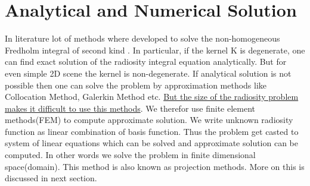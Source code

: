 \section{Analytical and Numerical Solution}
In literature lot of methods where developed to solve the non-homogeneous Fredholm integral of second kind \cite{iesurvey}\cite{ie}. In particular, if the kernel K is degenerate, one can find exact solution of the radiosity integral equation analytically\cite{ie}. But for even simple 2D scene the kernel is non-degenerate. If analytical solution is not possible then one can solve the problem by approximation methods like Collocation Method, Galerkin Method etc. \underline{ But the size of the radiosity problem makes it difficult to use this methods}. We therefor use finite element methods(FEM) to compute approximate solution. We write unknown radiosity function as linear combination of basis function. Thus the problem get casted to system of linear equations which can be solved and approximate solution can be computed. In other words we solve the problem in finite dimensional space(domain). This method is also known as projection methods. More on this is discussed in next section.

